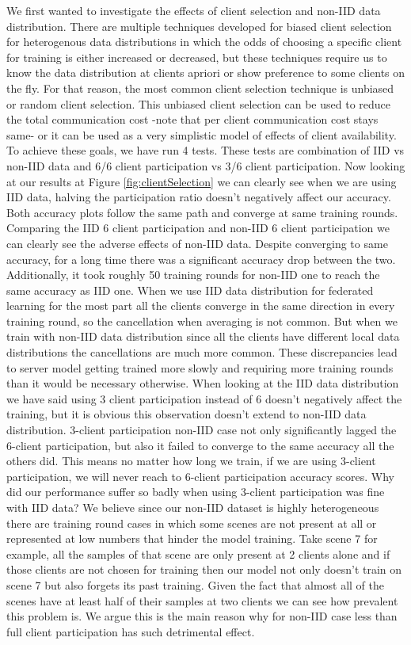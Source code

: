 \documentclass[11pt]{article}
\begin{document}
We first wanted to investigate the effects of client selection and non-IID data distribution. There are multiple techniques \cite{clientSelection1}\cite{clientSelection2} developed for biased client selection for heterogenous data distributions in which the odds of choosing a specific client for training is either increased or decreased, but these techniques require us to know the data distribution at clients apriori or show preference to some clients on the fly. For that reason, the most common client selection technique is unbiased or random client selection. This unbiased client selection can be used to reduce the total communication cost -note that per client communication cost stays same- or it can be used as a very simplistic model of effects of client availability. To achieve these goals, we have run 4 tests. These tests are combination of IID vs non-IID data and 6/6 client participation vs 3/6 client participation. Now looking at our results at Figure \ref{fig:clientSelection} we can clearly see when we are using IID data, halving the participation ratio doesn’t negatively affect our accuracy. Both accuracy plots follow the same path and converge at same training rounds. Comparing the IID 6 client participation and non-IID 6 client participation we can clearly see the adverse effects of non-IID data. Despite converging to same accuracy, for a long time there was a significant accuracy drop between the two. Additionally, it took roughly 50 training rounds for non-IID one to reach the same accuracy as IID one. When we use IID data distribution for federated learning for the most part all the clients converge in the same direction in every training round, so the cancellation when averaging is not common. But when we train with non-IID data distribution since all the clients have different local data distributions the cancellations are much more common. These discrepancies lead to server model getting trained more slowly and requiring more training rounds than it would be necessary otherwise. When looking at the IID data distribution we have said using 3 client participation instead of 6 doesn’t negatively affect the training, but it is obvious this observation doesn’t extend to non-IID data distribution. 3-client participation non-IID case not only significantly lagged the 6-client participation, but also it failed to converge to the same accuracy all the others did. This means no matter how long we train, if we are using 3-client participation, we will never reach to 6-client participation accuracy scores. Why did our performance suffer so badly when using 3-client participation was fine with IID data? We believe since our non-IID dataset is highly heterogeneous there are training round cases in which some scenes are not present at all or represented at low numbers that hinder the model training. Take scene 7 for example, all the samples of that scene are only present at 2 clients alone and if those clients are not chosen for training then our model not only doesn’t train on scene 7 but also forgets its past training. Given the fact that almost all of the scenes have at least half of their samples at two clients we can see how prevalent this problem is. We argue this is the main reason why for non-IID case less than full client participation has such detrimental effect.
\end{document}

